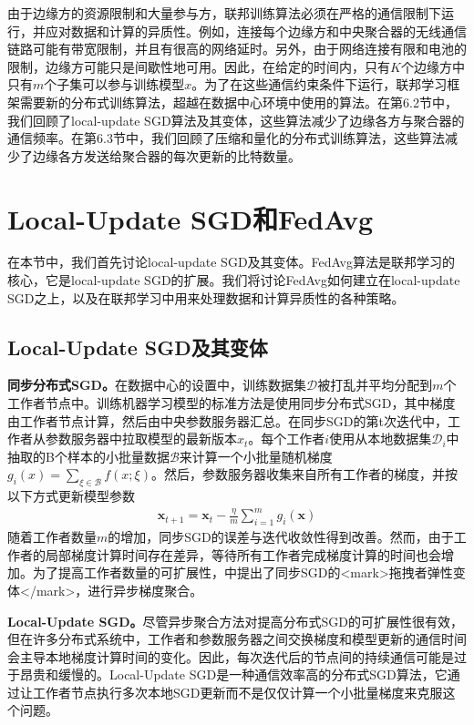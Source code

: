 由于边缘方的资源限制和大量参与方，联邦训练算法必须在严格的通信限制下运行，并应对数据和计算的异质性。例如，连接每个边缘方和中央聚合器的无线通信链路可能有带宽限制，并且有很高的网络延时。另外，由于网络连接有限和电池的限制，边缘方可能只是间歇性地可用。因此，在给定的时间内，只有$K$个边缘方中只有$m$个子集可以参与训练模型$x$。为了在这些通信约束条件下运行，联邦学习框架需要新的分布式训练算法，超越在数据中心环境中使用的算法。在第6.2节中，我们回顾了local-update SGD算法及其变体，这些算法减少了边缘各方与聚合器的通信频率。在第6.3节中，我们回顾了压缩和量化的分布式训练算法，这些算法减少了边缘各方发送给聚合器的每次更新的比特数量。

\section{Local-Update SGD和FedAvg}

在本节中，我们首先讨论local-update SGD及其变体。FedAvg算法是联邦学习的核心，它是local-update SGD的扩展。我们将讨论FedAvg如何建立在local-update SGD之上，以及在联邦学习中用来处理数据和计算异质性的各种策略。

\subsection{Local-Update SGD及其变体}

\textbf{同步分布式SGD。}在数据中心的设置中，训练数据集$\mathcal{D}$被打乱并平均分配到$m$个工作者节点中。训练机器学习模型的标准方法是使用同步分布式SGD，其中梯度由工作者节点计算，然后由中央参数服务器汇总。在同步SGD的第t次迭代中，工作者从参数服务器中拉取模型的最新版本$x_{t}$。每个工作者$i$使用从本地数据集$\mathcal{D}_{i}$中抽取的B个样本的小批量数据$\mathcal{B}$来计算一个小批量随机梯度$g_{i}(x) = \sum_{\xi \in \mathcal{B}} f(x;\xi)$。然后，参数服务器收集来自所有工作者的梯度，并按以下方式更新模型参数
\begin{align}
	\bm{x}_{t+1} = \bm{x}_{t} - \frac{\eta}{m}\sum_{i=1}^{m}g_{i}(\bm{x})
\end{align}
随着工作者数量$m$的增加，同步SGD的误差与迭代收敛性得到改善。然而，由于工作者的局部梯度计算时间存在差异，等待所有工作者完成梯度计算的时间也会增加。为了提高工作者数量的可扩展性，中提出了同步SGD的<mark>拖拽者弹性变体</mark>，进行异步梯度聚合。

\textbf{Local-Update SGD。}尽管异步聚合方法对提高分布式SGD的可扩展性很有效，但在许多分布式系统中，工作者和参数服务器之间交换梯度和模型更新的通信时间会主导本地梯度计算时间的变化。因此，每次迭代后的节点间的持续通信可能是过于昂贵和缓慢的。Local-Update SGD是一种通信效率高的分布式SGD算法，它通过让工作者节点执行多次本地SGD更新而不是仅仅计算一个小批量梯度来克服这个问题。

